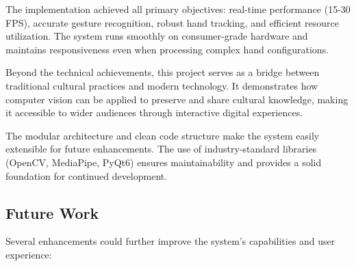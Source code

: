 \documentclass{article}
\begin{document}
The implementation achieved all primary objectives: real-time performance (15-30 FPS), accurate gesture recognition, robust hand tracking, and efficient resource utilization. The system runs smoothly on consumer-grade hardware and maintains responsiveness even when processing complex hand configurations.

Beyond the technical achievements, this project serves as a bridge between traditional cultural practices and modern technology. It demonstrates how computer vision can be applied to preserve and share cultural knowledge, making it accessible to wider audiences through interactive digital experiences.

The modular architecture and clean code structure make the system easily extensible for future enhancements. The use of industry-standard libraries (OpenCV, MediaPipe, PyQt6) ensures maintainability and provides a solid foundation for continued development.

\subsection{Future Work}

Several enhancements could further improve the system's capabilities and user experience:
\end{document}
